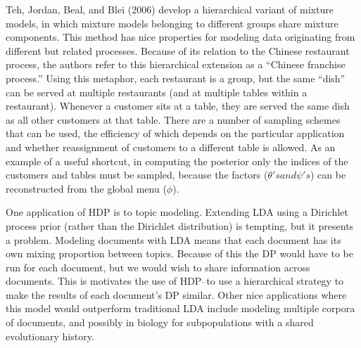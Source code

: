\documentclass[12pt,letterpaper]{article}
\begin{document}

Teh, Jordan, Beal, and Blei (2006) develop a hierarchical variant of mixture models, in which mixture models belonging to different groups share mixture components. This method has nice properties for modeling data originating from different but related processes. Because of its relation to the Chinese restaurant process, the authors refer to this hierarchical extension as a ``Chinese franchise process.'' Using this metaphor, each restaurant is a group, but the same ``dish'' can be served at multiple restaurants (and at multiple tables within a restaurant). Whenever a customer sits at a table, they are served the same dish as all other customers at that table. There are a number of sampling schemes that can be used, the efficiency of which depends on the particular application and whether reassignment of customers to a different table is allowed. As an example of a useful shortcut, in computing the posterior only the indices of the customers and tables must be sampled, because the factors ($\theta's and \psi's$) can be reconstructed from the global menu ($\phi$). 

One application of HDP is to topic modeling. Extending LDA using a Dirichlet process prior (rather than the Dirichlet distribution) is tempting, but it presents a problem. Modeling documents with LDA means that each document has its own mixing proportion between topics. Because of this the DP would have to be run for each document, but we would wish to share information across documents. This is motivates the use of HDP--to use a hierarchical strategy to make the results of each document's DP similar. Other nice applications where this model would outperform traditional LDA include modeling multiple corpora of documents, and possibly in biology for subpopulations with a shared evolutionary history. 
\end{document}
